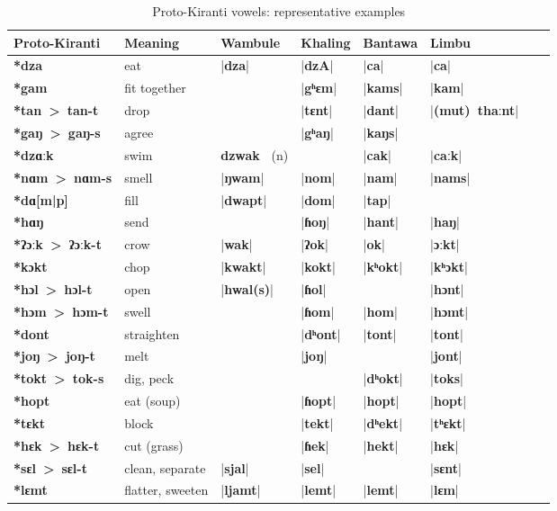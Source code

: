 \documentclass[oneside,a4paper,11pt]{article}
\newcommand{\ipa}[1]{\textbf{{\phon\mbox{#1}}}} %
\newcommand{\dhat}[1]{|\ipa{#1}|}
\begin{document}
 \begin{table}[H]
 \caption{Proto-Kiranti vowels: representative examples} \centering \label{tab:vowels.ex}
 \begin{tabular}{llllllll}
 \toprule
Proto-Kiranti & Meaning &Wambule & Khaling & Bantawa & Limbu \\
 \midrule
\ipa{*dza} &	eat &	\dhat{dza} &	\dhat{dzA} &	\dhat{ca} &	\dhat{ca} &	\\
\ipa{*gam} &	fit together &	&	\dhat{gʰɛm} &	\dhat{kams} &	\dhat{kam} &	\\
\ipa{*tan > tan-t} &	drop &	&	\dhat{tɛnt} &	\dhat{dant} &	\dhat{(mut) thaːnt} &	\\
\ipa{*gaŋ > gaŋ-s} &	agree &	&	\dhat{gʰaŋ} &	\dhat{kaŋs} &	&	\\
 \midrule						
\ipa{*dzɑːk} &	swim &	\ipa{dzwak } (n) &	&	\dhat{cak} &	\dhat{caːk} &	\\
\ipa{*nɑm > nɑm-s} &	smell &	\dhat{ŋwam} &	\dhat{nom} &	\dhat{nam} &	\dhat{nams} &	\\
\ipa{*dɑ[m|p]} &	fill &	\dhat{dwapt} &	\dhat{dom} &	\dhat{tap} &	&	\\
\ipa{*hɑŋ} &	send &	&	\dhat{ɦoŋ} &	\dhat{hant} &	\dhat{haŋ} &	\\
\midrule
\ipa{*ʔɔːk > ʔɔːk-t} &	crow &	\dhat{wak} &	\dhat{ʔok} &	\dhat{ok} &	\dhat{ɔːkt} &	\\
\ipa{*kɔkt} &	chop &	\dhat{kwakt} &	\dhat{kokt} &	\dhat{kʰokt} &	\dhat{kʰɔkt} &	\\
\ipa{*hɔl > hɔl-t} &	open &	\dhat{hwal(s)} &	\dhat{ɦol} &	&	\dhat{hɔnt} &	\\
\ipa{*hɔm > hɔm-t} &	swell &	&	\dhat{ɦom} &	\dhat{hom} &	\dhat{hɔmt} &	\\
\midrule
\ipa{*dont} &	straighten &	&	\dhat{dʰont} &	\dhat{tont} &	\dhat{tont} &	\\
\ipa{*joŋ > joŋ-t} &	melt &	&	\dhat{joŋ} &	&	\dhat{jont} &	\\
\ipa{*tokt > tok-s} &	dig, peck &	&	&	\dhat{dʰokt} &	\dhat{toks} &	\\
\ipa{*hopt} &	eat (soup) &	&	\dhat{ɦopt} &	\dhat{hopt} &	\dhat{hopt} &	\\
\midrule
\ipa{*tɛkt} &	block &	&	\dhat{tekt} &	\dhat{dʰekt} &	\dhat{tʰɛkt} &	\\
\ipa{*hɛk > hɛk-t} &	cut (grass) &	&	\dhat{ɦek} &	\dhat{hekt} &	\dhat{hɛk} &	\\
\ipa{*sɛl > sɛl-t} &	clean, separate &	\dhat{sjal} &	\dhat{sel} &	&	\dhat{sɛnt} &	\\
\ipa{*lɛmt} &	flatter, sweeten &	\dhat{ljamt} &	\dhat{lemt} &	\dhat{lemt} &	\dhat{lɛm} &	\\

\end{tabular}
\end{table}
\end{document}
